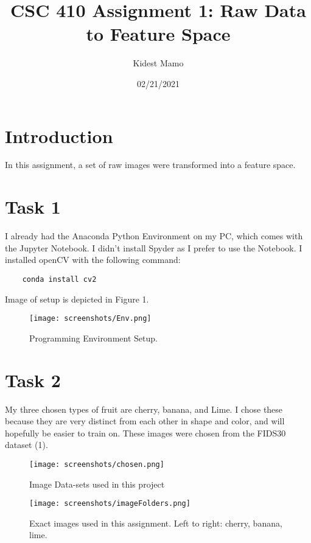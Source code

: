 \documentclass[sigconf]{acmart}
\begin{document}
\fancyhead{}
\def\thetitle{CSC 410 Assignment 1: Raw Data to Feature Space}
\title{\thetitle}

\author{Kidest Mamo}

\date{02/21/2021}


\maketitle

\section{Introduction}
  In this assignment, a set of raw images were transformed into a feature space.

\section{Task 1}
I already had the Anaconda Python Environment on my PC, which comes with the Jupyter Notebook. I didn't install Spyder as I prefer to use the Notebook. I installed openCV with the following command: \begin{verbatim}
    conda install cv2
\end{verbatim}
Image of setup is depicted in Figure 1.

\begin{figure}[h]
  \centering
  \texttt{[image: screenshots/Env.png]}
  \caption{Programming Environment Setup.}
  \label{fig:programmingEnvironment}
\end{figure}

\section{Task 2}
My three chosen types of fruit are cherry, banana, and Lime. I chose these because they are very distinct from each other in shape and color, and will hopefully be easier to train on. These images were chosen from the FIDS30 dataset (1).
\begin{figure}[h]
  \centering
  \texttt{[image: screenshots/chosen.png]}
  \caption{Image Data-sets used in this project}
  \label{fig:imageDataset}

\end{figure}
\begin{figure}[h]
  \centering
  \texttt{[image: screenshots/imageFolders.png]}
  \caption{Exact images used in this assignment. Left to right: cherry, banana, lime.}
  \label{fig:imageFolders}

\end{figure}
\end{document}
